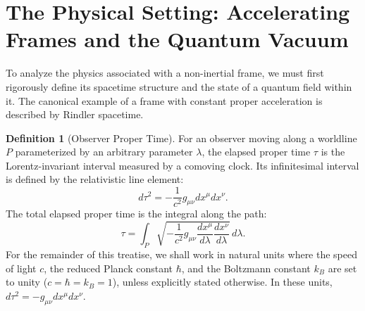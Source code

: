 \documentclass[11pt, letterpaper]{report}
\theoremstyle{plain} %
\theoremstyle{definition} %
\newtheorem{definition}{Definition}[chapter]
\theoremstyle{remark} %
\begin{document}
\section{The Physical Setting: Accelerating Frames and the Quantum Vacuum}
\label{sec:rindler_frame_final}
To analyze the physics associated with a non-inertial frame, we must first rigorously define its spacetime structure and the state of a quantum field within it. The canonical example of a frame with constant proper acceleration is described by Rindler spacetime.

\begin{definition}[Observer Proper Time]
\label{def:proper_time_final}
For an observer moving along a worldline $P$ parameterized by an arbitrary parameter $\lambda$, the elapsed proper time $\tau$ is the Lorentz-invariant interval measured by a comoving clock. Its infinitesimal interval is defined by the relativistic line element:
\begin{equation}
    d\tau^2 = - \frac{1}{c^2} g_{\mu\nu} dx^\mu dx^\nu.
\end{equation}
The total elapsed proper time is the integral along the path:
\begin{equation}
    \tau = \int_P \sqrt{- \frac{1}{c^2} g_{\mu\nu} \frac{dx^\mu}{d\lambda}\frac{dx^\nu}{d\lambda}} \, d\lambda.
\end{equation}
For the remainder of this treatise, we shall work in natural units where the speed of light $c$, the reduced Planck constant $\hbar$, and the Boltzmann constant $k_B$ are set to unity ($c = \hbar = k_B = 1$), unless explicitly stated otherwise. In these units, $d\tau^2 = -g_{\mu\nu}dx^\mu dx^\nu$.
\end{definition}
\end{document}

